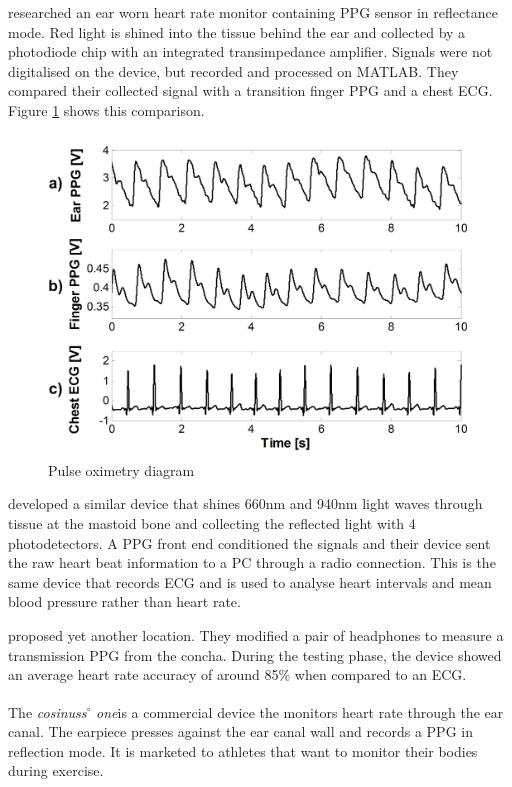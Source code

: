 \cite{da2010ear} researched an ear worn heart rate monitor containing PPG sensor in reflectance mode. Red light is shined into the tissue behind the ear and collected by a photodiode chip with an integrated transimpedance amplifier. Signals were not digitalised on the device, but recorded and processed on MATLAB. They compared their collected signal with a transition finger PPG and a chest ECG. Figure \ref{fig:DaHe} shows this comparison.

\medskip

\begin{figure}[h]
   \centering
   \includegraphics[scale=0.15]{figs/DaHe}
   \caption{Pulse oximetry diagram \citep{da2010ear}}
   \label{fig:DaHe}
\end{figure}

\cite{winokur2012wearable} developed a similar device that shines 660nm and 940nm light waves through tissue at the mastoid bone and collecting the reflected light with 4 photodetectors. A PPG front end conditioned the signals and their device sent the raw heart beat information to a PC through a radio connection. This is the same device that records ECG and is used to analyse heart intervals and mean blood pressure rather than heart rate.

\medskip
\cite{buskeheartbeat} proposed yet another location. They modified a pair of headphones to measure a transmission PPG from the concha. During the testing phase, the device showed an average heart rate accuracy of around 85\% when compared to an ECG.

\medskip
The \textit{cosinuss}$^{\circ}$ \textit{one}\textsuperscript \textregistered is a commercial device the monitors heart rate through the ear canal. The earpiece presses against the ear canal wall and records a PPG in reflection mode. It is marketed to athletes that want to monitor their bodies during exercise.


